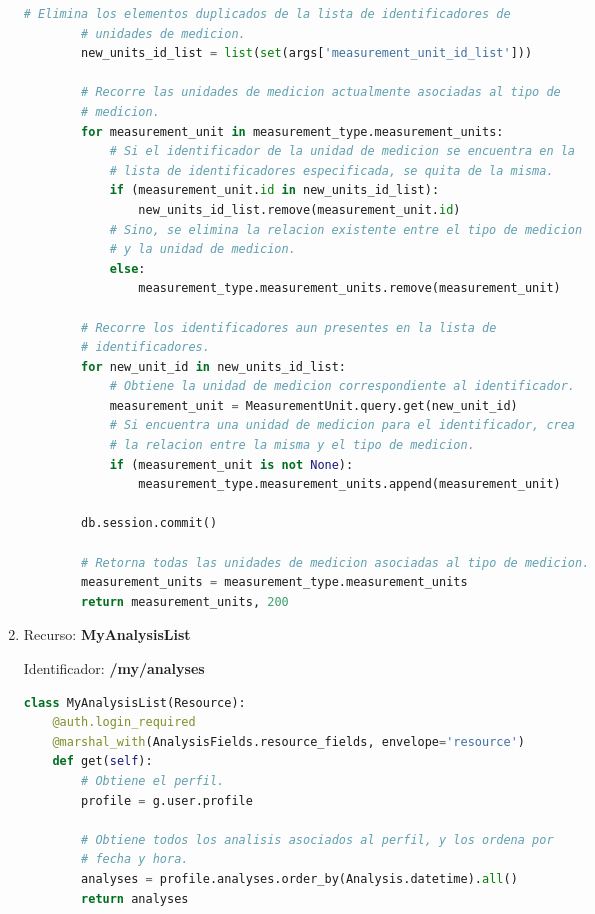 \begin{enumerate}
\begin{lstlisting}[language=Python]
        # Elimina los elementos duplicados de la lista de identificadores de
        # unidades de medicion.
        new_units_id_list = list(set(args['measurement_unit_id_list']))

        # Recorre las unidades de medicion actualmente asociadas al tipo de
        # medicion.
        for measurement_unit in measurement_type.measurement_units:
            # Si el identificador de la unidad de medicion se encuentra en la
            # lista de identificadores especificada, se quita de la misma.
            if (measurement_unit.id in new_units_id_list):
                new_units_id_list.remove(measurement_unit.id)
            # Sino, se elimina la relacion existente entre el tipo de medicion
            # y la unidad de medicion.
            else:
                measurement_type.measurement_units.remove(measurement_unit)

        # Recorre los identificadores aun presentes en la lista de
        # identificadores.
        for new_unit_id in new_units_id_list:
            # Obtiene la unidad de medicion correspondiente al identificador.
            measurement_unit = MeasurementUnit.query.get(new_unit_id)
            # Si encuentra una unidad de medicion para el identificador, crea
            # la relacion entre la misma y el tipo de medicion.
            if (measurement_unit is not None):
                measurement_type.measurement_units.append(measurement_unit)

        db.session.commit()

        # Retorna todas las unidades de medicion asociadas al tipo de medicion.
        measurement_units = measurement_type.measurement_units
        return measurement_units, 200
\end{lstlisting}

\item Recurso: \textbf{MyAnalysisList}

Identificador: \textbf{/my/analyses}

\begin{lstlisting}[language=Python]
class MyAnalysisList(Resource):
    @auth.login_required
    @marshal_with(AnalysisFields.resource_fields, envelope='resource')
    def get(self):
        # Obtiene el perfil.
        profile = g.user.profile

        # Obtiene todos los analisis asociados al perfil, y los ordena por
        # fecha y hora.
        analyses = profile.analyses.order_by(Analysis.datetime).all()
        return analyses


\end{lstlisting}
\end{enumerate}

